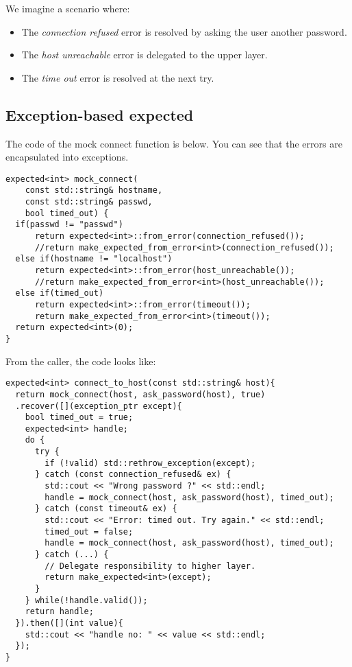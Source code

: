 \documentclass[a4paper,10pt]{article}
\begin{document}
We imagine a scenario where:

\begin{itemize}
 \item The \textit{connection refused} error is resolved by asking the user another password.
 \item The \textit{host unreachable} error is delegated to the upper layer.
 \item The \textit{time out} error is resolved at the next try.
\end{itemize}

\subsection{Exception-based expected}

The code of the mock connect function is below. You can see that the errors are encapsulated into exceptions.
\begin{lstlisting}
expected<int> mock_connect(
    const std::string& hostname, 
    const std::string& passwd, 
    bool timed_out) {
  if(passwd != "passwd")
      return expected<int>::from_error(connection_refused());
      //return make_expected_from_error<int>(connection_refused());
  else if(hostname != "localhost")
      return expected<int>::from_error(host_unreachable());
      //return make_expected_from_error<int>(host_unreachable());
  else if(timed_out)
      return expected<int>::from_error(timeout());
      return make_expected_from_error<int>(timeout());
  return expected<int>(0);
}
\end{lstlisting}

From the caller, the code looks like:

\begin{lstlisting}
expected<int> connect_to_host(const std::string& host){
  return mock_connect(host, ask_password(host), true)
  .recover([](exception_ptr except){
    bool timed_out = true;
    expected<int> handle;
    do { 
      try {  
        if (!valid) std::rethrow_exception(except);
      } catch (const connection_refused& ex) {
        std::cout << "Wrong password ?" << std::endl;
        handle = mock_connect(host, ask_password(host), timed_out);
      } catch (const timeout& ex) {
        std::cout << "Error: timed out. Try again." << std::endl;
        timed_out = false;
        handle = mock_connect(host, ask_password(host), timed_out);
      } catch (...) {
        // Delegate responsibility to higher layer.
        return make_expected<int>(except);      
      }
    } while(!handle.valid());
    return handle;
  }).then([](int value){
    std::cout << "handle no: " << value << std::endl;
  });
}
\end{lstlisting}
\end{document}
